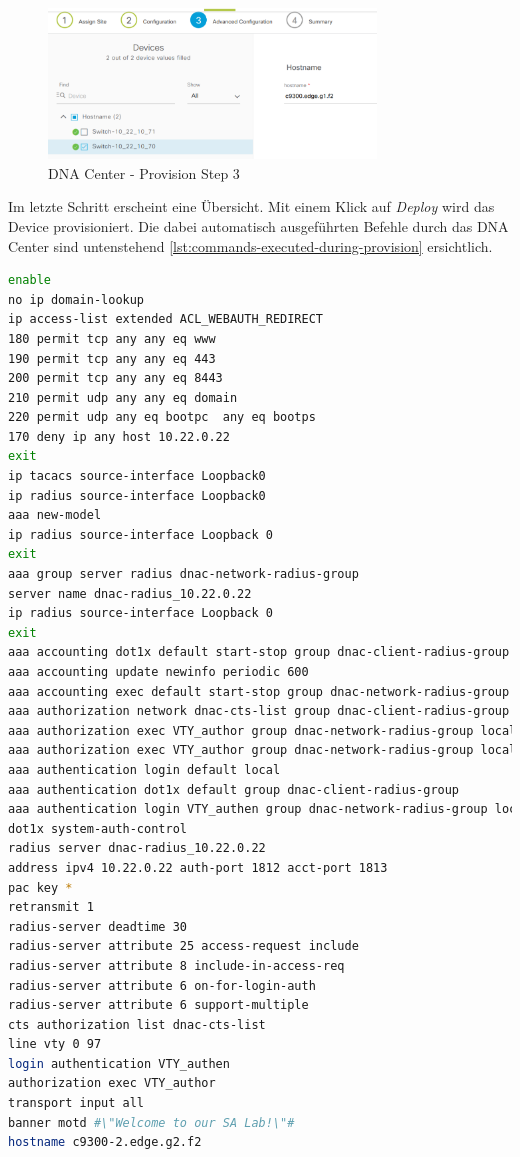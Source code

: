 \begin{figure}[H]
	\centering
	\includegraphics[height=4cm]{img/secondtry/dna-center-provision-step3.png}
	\caption{DNA Center - Provision Step 3}
	\label{fig:dna-center-provision-step3}
\end{figure}

Im letzte Schritt erscheint eine Übersicht. Mit einem Klick auf \textit{Deploy} wird das Device provisioniert. Die dabei automatisch ausgeführten Befehle durch das DNA Center sind untenstehend \ref{lst:commands-executed-during-provision} ersichtlich.

\begin{lstlisting}[caption={Befehle automatisch ausgeführt durch das DNA Center während der Provisionierung},label={lst:commands-executed-during-provision},language=bash]
enable
no ip domain-lookup 
ip access-list extended ACL_WEBAUTH_REDIRECT
180 permit tcp any any eq www 
190 permit tcp any any eq 443 
200 permit tcp any any eq 8443 
210 permit udp any any eq domain 
220 permit udp any eq bootpc  any eq bootps 
170 deny ip any host 10.22.0.22
exit 
ip tacacs source-interface Loopback0 
ip radius source-interface Loopback0 
aaa new-model 
ip radius source-interface Loopback 0
exit 
aaa group server radius dnac-network-radius-group
server name dnac-radius_10.22.0.22
ip radius source-interface Loopback 0
exit 
aaa accounting dot1x default start-stop group dnac-client-radius-group
aaa accounting update newinfo periodic 600
aaa accounting exec default start-stop group dnac-network-radius-group
aaa authorization network dnac-cts-list group dnac-client-radius-group
aaa authorization exec VTY_author group dnac-network-radius-group local if-authenticated 
aaa authorization exec VTY_author group dnac-network-radius-group local 
aaa authentication login default local 
aaa authentication dot1x default group dnac-client-radius-group
aaa authentication login VTY_authen group dnac-network-radius-group local 
dot1x system-auth-control 
radius server dnac-radius_10.22.0.22
address ipv4 10.22.0.22 auth-port 1812 acct-port 1813
pac key *
retransmit 1
radius-server deadtime 30
radius-server attribute 25 access-request include 
radius-server attribute 8 include-in-access-req 
radius-server attribute 6 on-for-login-auth 
radius-server attribute 6 support-multiple 
cts authorization list dnac-cts-list
line vty 0 97
login authentication VTY_authen
authorization exec VTY_author
transport input all 
banner motd #\"Welcome to our SA Lab!\"#
hostname c9300-2.edge.g2.f2

\end{lstlisting}

